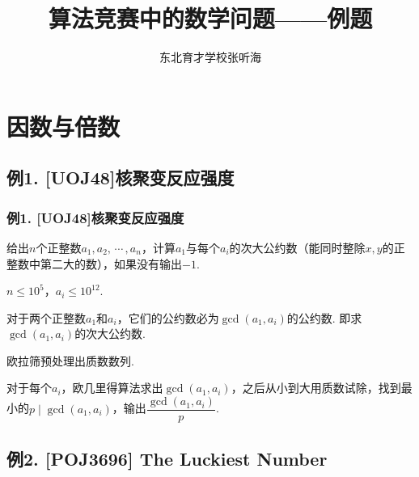 \documentclass{beamer}
\title{\xw 算法竞赛中的数学问题——例题}
\author{\li 东北育才学校\quad \xk 张听海}
\def\tcdots{\,\!\cdots\!\,}
\def\bkh{\!\!（}
\def\ekh{）\!\!}
\def\leq{\leqslant}
\def\dou{，\!\!}
\begin{document}
    \renewcommand{\baselinestretch}{1.25}\normalsize
    \setlength{\parindent}{0em}
    \setlength{\abovedisplayskip}{1pt}
    \setlength{\belowdisplayskip}{1pt}
    
    \maketitle

    \begin{frame}[shrink]
        \tableofcontents[hideothersubsections]
    \end{frame}

    \section{因数与倍数}

    \subsection{例1. [UOJ48]核聚变反应强度}

    \begin{frame}
        \frametitle{例1. [UOJ48]核聚变反应强度}

        \begin{block}

            给出$n$个正整数$a_1,a_2,\tcdots,a_n$\dou 计算$a_1$与每个$a_i$的次大公约数\bkh 能同时整除$x,y$的正整数中第二大的数\ekh\dou 如果没有输出$-1$.\pause

            $n\leq {10}^5$\dou $a_i\leq {10}^{12}$.\pause
        \end{block}

        对于两个正整数$a_1$和$a_i$\dou 它们的公约数必为$\gcd(a_1,a_i)$的公约数. 即求$\gcd(a_1,a_i)$的次大公约数.\pause

        欧拉筛预处理出质数数列.\pause

        对于每个$a_i$\dou 欧几里得算法求出$\gcd(a_1,a_i)$\dou 之后从小到大用质数试除\dou 找到最小的$p\mid\gcd(a_1,a_i)$\dou 输出$\dfrac{\gcd(a_1,a_i)}{p}$.
    \end{frame}

    \subsection{例2. [POJ3696] The Luckiest Number}
\end{document}
